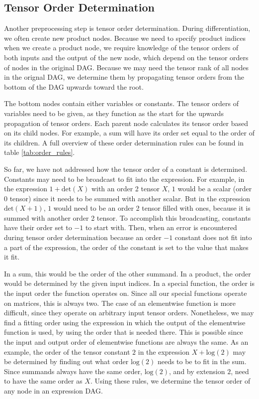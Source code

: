 \documentclass[12pt, a4paper]{report}
\begin{document}
\subsection{Tensor Order Determination}
Another preprocessing step is tensor order determination.
During differentiation, we often create new product nodes.
Because we need to specify product indices when we create a product node, we require knowledge of the tensor orders of both inputs and the output of the new node, which depend on the tensor orders of nodes in the original DAG.
Because we may need the tensor rank of all nodes in the orignal DAG, we determine them by propagating tensor orders from the bottom of the DAG upwards toward the root.

The bottom nodes contain either variables or constants.
The tensor orders of variables need to be given, as they function as the start for the upwards propagation of tensor orders.
Each parent node calculates its tensor order based on its child nodes.
For example, a sum will have its order set equal to the order of its children.
A full overview of these order determination rules can be found in table \ref{tab:order_rules}.

So far, we have not addressed how the tensor order of a constant is determined.
Constants may need to be broadcast to fit into the expression.
For example, in the expression $1 + \text{det}(X)$ with an order 2 tensor $X$, $1$ would be a scalar (order 0 tensor) since it needs to be summed with another scalar.
But in the expression $\text{det}(X + 1)$, $1$ would need to be an order 2 tensor filled with ones, because it is summed with another order 2 tensor.
To accomplish this broadcasting, constants have their order set to $-1$ to start with.
Then, when an error is encountered during tensor order determination because an order $-1$ constant does not fit into a part of the expression, the order of the constant is set to the value that makes it fit.

In a sum, this would be the order of the other summand.
In a product, the order would be determined by the given input indices.
In a special function, the order is the input order the function operates on. Since all our special functions operate on matrices, this is always two.
The case of an elementwise function is more difficult, since they operate on arbitrary input tensor orders.
Nonetheless, we may find a fitting order using the expression in which the output of the elementwise function is used, by using the order that is needed there.
This is possible since the input and output order of elementwise functions are always the same.
As an example, the order of the tensor constant $2$ in the expression $X + \text{log}(2)$ may be determined by finding out what order $\text{log}(2)$ needs to be to fit in the sum.
Since summands always have the same order, $\text{log}(2)$, and by extension $2$, need to have the same order as $X$.
Using these rules, we determine the tensor order of any node in an expression DAG.
\end{document}
